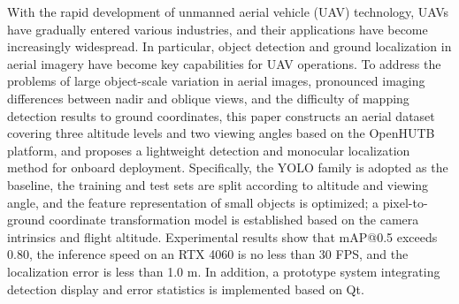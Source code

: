\begin{abstracten}

With the rapid development of unmanned aerial vehicle (UAV) technology, UAVs have gradually entered various industries, and their applications have become increasingly widespread. In particular, object detection and ground localization in aerial imagery have become key capabilities for UAV operations. To address the problems of large object-scale variation in aerial images, pronounced imaging differences between nadir and oblique views, and the difficulty of mapping detection results to ground coordinates, this paper constructs an aerial dataset covering three altitude levels and two viewing angles based on the OpenHUTB platform, and proposes a lightweight detection and monocular localization method for onboard deployment. Specifically, the YOLO family is adopted as the baseline, the training and test sets are split according to altitude and viewing angle, and the feature representation of small objects is optimized; a pixel-to-ground coordinate transformation model is established based on the camera intrinsics and flight altitude. Experimental results show that mAP@0.5 exceeds 0.80, the inference speed on an RTX 4060 is no less than 30 FPS, and the localization error is less than 1.0 m. In addition, a prototype system integrating detection display and error statistics is implemented based on Qt.


\end{abstracten}